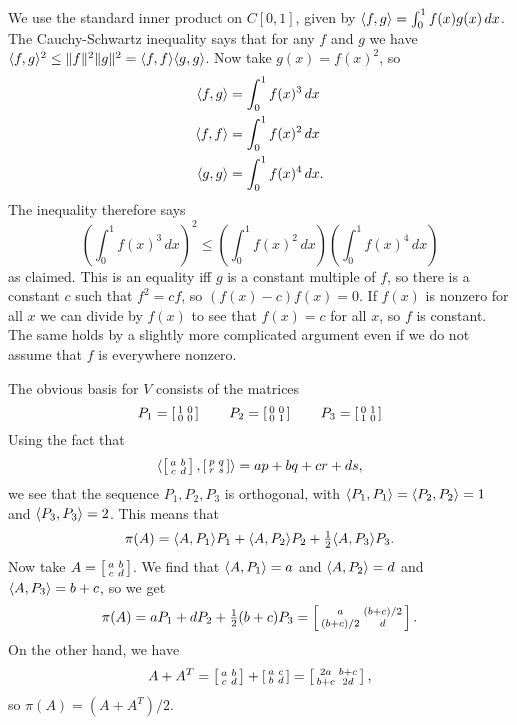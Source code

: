  We use the standard inner product on $C[0,1]$, given by
 $\langle f,g\rangle=\int_0^1f(x)g(x)\,dx$.  The Cauchy-Schwartz
 inequality says that for any $f$ and $g$ we have
 $\langle f,g\rangle^2\leq\|f\|^2\|g\|^2=\langle f,f\rangle\langle g,g\rangle$.  Now take
 $g(x)=f(x)^2$, so
 \begin{align*}
  \langle f,g\rangle &= \int_0^1 f(x)^3\,dx \\
  \langle f,f\rangle &= \int_0^1 f(x)^2\,dx \\
  \langle g,g\rangle &= \int_0^1 f(x)^4\,dx.
 \end{align*}
 The inequality therefore says
 \[\left(\int_0^1 f(x)^3\,dx\right)^2 \leq
     \left(\int_0^1 f(x)^2\,dx\right)
     \left(\int_0^1 f(x)^4\,dx\right)
 \]
 as claimed.  This is an equality iff $g$ is a constant multiple of
 $f$, so there is a constant $c$ such that $f^2=cf$, so
 $(f(x)-c)f(x)=0$.  If $f(x)$ is nonzero for all $x$ we can divide by
 $f(x)$ to see that $f(x)=c$ for all $x$, so $f$ is constant.  The
 same holds by a slightly more complicated argument even if we do not
 assume that $f$ is everywhere nonzero.
\EndDeferredSolution

 The obvious basis for $V$ consists of the matrices
 \[ P_1 = \left[\begin{smallmatrix} 1&0\\0&0 \end{smallmatrix}\right] \hspace{2em}
    P_2 = \left[\begin{smallmatrix} 0&0\\0&1 \end{smallmatrix}\right] \hspace{2em}
    P_3 = \left[\begin{smallmatrix} 0&1\\1&0 \end{smallmatrix}\right]
 \]
 Using the fact that
 \[ \langle \left[\begin{smallmatrix} a&b \\ c&d\end{smallmatrix}\right], \left[\begin{smallmatrix} p&q \\ r&s\end{smallmatrix}\right]\rangle
     = ap + bq + cr + ds,
 \]
 we see that the sequence $P_1,P_2,P_3$ is orthogonal, with
 $\langle P_1,P_1\rangle=\langle P_2,P_2\rangle=1$ and $\langle P_3,P_3\rangle=2$.  This
 means that
 \[ \pi(A) =
     \langle A,P_1\rangle P_1 + \langle A,P_2\rangle P_2 + {\textstyle\frac{1}{2}}\langle A,P_3\rangle P_3.
 \]
 Now take $A=\left[\begin{smallmatrix} a&b\\ c&d\end{smallmatrix}\right]$.  We find that
 $\langle A,P_1\rangle=a$ and $\langle A,P_2\rangle=d$ and $\langle A,P_3\rangle=b+c$, so
 we get
 \[ \pi(A) =
     a P_1 + d P_2 + {\textstyle\frac{1}{2}}(b+c) P_3 =
     \left[\begin{smallmatrix} a & (b+c)/2 \\ (b+c)/2 & d \end{smallmatrix}\right].
 \]
 On the other hand, we have
 \[ A+A^T = \left[\begin{smallmatrix} a & b \\ c & d \end{smallmatrix}\right] +
            \left[\begin{smallmatrix} a & c \\ b & d \end{smallmatrix}\right]
          = \left[\begin{smallmatrix} 2a & b+c \\ b+c & 2d \end{smallmatrix}\right],
 \]
 so $\pi(A)=(A+A^T)/2$.
\EndDeferredSolution

